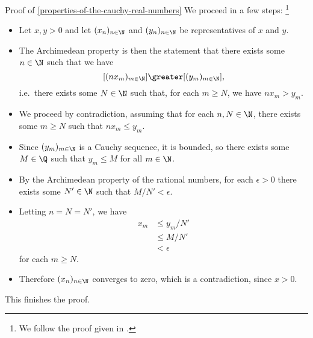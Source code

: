 \begin{Proof}{Proof of \cref{properties-of-the-cauchy-real-numbers}}
    We proceed in a few steps:%
    \footnote{%
        We follow the proof given in \cite[Theorem 4.11]{kemp:cauchy-s-construction-of-r}.
    }%
    \begin{itemize}
        \item Let $x,y\greater0$ and let $(x_{n})_{n\in\N}$ and $(y_{n})_{n\in\N}$ be representatives of $x$ and $y$.
        \item The Archimedean property is then the statement that there exists some $n\in\N$ such that we have
            \[
                [(nx_{m})_{m\in\N}]%
                \greater%
                [(y_{m})_{m\in\N}],%
            \]%
            i.e.\ there exists some $N\in\N$ such that, for each $m\geq N$, we have $nx_{m}\greater y_{m}$.
        \item We proceed by contradiction, assuming that for each $n,N\in\N$, there exists some $m\geq N$ such that $nx_{m}\leq y_{m}$.
        \item Since $(y_{m})_{m\in\N}$ is a Cauchy sequence, it is bounded, so there exists some $M\in\Q$ such that $y_{m}\leq M$ for all $m\in\N$.
        \item By the Archimedean property of the rational numbers, for each $\epsilon\greater0$ there exists some $N'\in\N$ such that $M/N'\less\epsilon$.
        \item Letting $n=N=N'$, we have
            \begin{align*}
                x_{m} &\leq  y_{m}/N'\\
                      &\leq  M/N'\\
                      &\less \epsilon
            \end{align*}
            for each $m\geq N$.
        \item Therefore $(x_{n})_{n\in\N}$ converges to zero, which is a contradiction, since $x\greater0$.
    \end{itemize}
    This finishes the proof.


\end{Proof}

